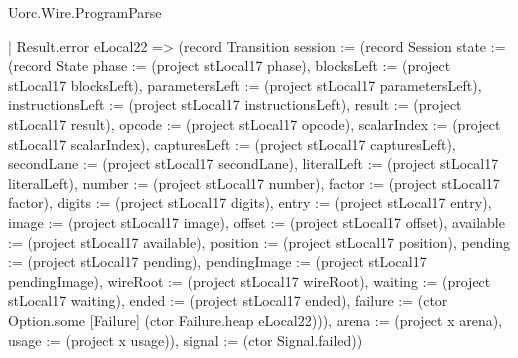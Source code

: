 \begin{lexlean}{Uorc.Wire.ProgramParse}
\begin{semanticmodule}
{        | Result.error eLocal22 => (record Transition {session := (record Session {state := (record State {phase := (project stLocal17 phase), blocksLeft := (project stLocal17 blocksLeft), parametersLeft := (project stLocal17 parametersLeft), instructionsLeft := (project stLocal17 instructionsLeft), result := (project stLocal17 result), opcode := (project stLocal17 opcode), scalarIndex := (project stLocal17 scalarIndex), capturesLeft := (project stLocal17 capturesLeft), secondLane := (project stLocal17 secondLane), literalLeft := (project stLocal17 literalLeft), number := (project stLocal17 number), factor := (project stLocal17 factor), digits := (project stLocal17 digits), entry := (project stLocal17 entry), image := (project stLocal17 image), offset := (project stLocal17 offset), available := (project stLocal17 available), position := (project stLocal17 position), pending := (project stLocal17 pending), pendingImage := (project stLocal17 pendingImage), wireRoot := (project stLocal17 wireRoot), waiting := (project stLocal17 waiting), ended := (project stLocal17 ended), failure := (ctor Option.some [Failure] (ctor Failure.heap eLocal22))}), arena := (project x arena), usage := (project x usage)}), signal := (ctor Signal.failed)})
}
\end{semanticmodule}
\end{lexlean}
